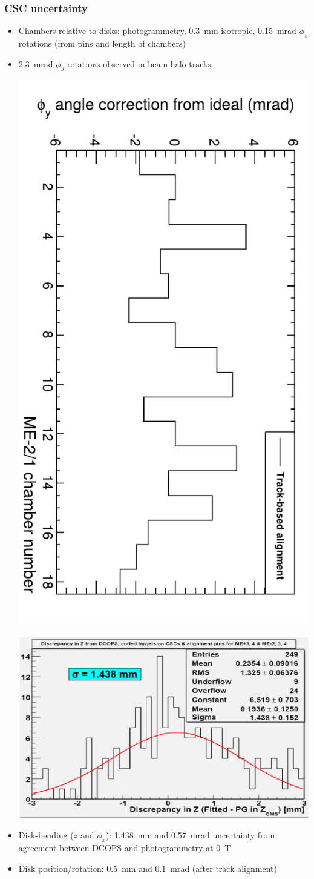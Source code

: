 \documentclass[compress]{beamer}
\begin{document}
\begin{frame}
\frametitle{CSC uncertainty}
\begin{itemize}\setlength{\itemsep}{0.25 cm}
\item Chambers relative to disks: photogrammetry, 0.3~mm isotropic,
  0.15~mrad $\phi_z$ rotations (from pins and length of chambers)
\item 2.3~mrad $\phi_y$ rotations observed in beam-halo tracks

\mbox{\hspace{-1 cm}\includegraphics[height=0.6\linewidth, angle=90]{compare_m21_phiy.pdf}
\includegraphics[width=0.5\linewidth]{dcops_in_z_replacement.png}}

\item Disk-bending ($z$ and $\phi_x$): 1.438~mm and 0.57~mrad
  uncertainty from agreement between DCOPS and photogrammetry at 0~T
\item Disk position/rotation: 0.5~mm and 0.1~mrad (after track alignment)
\end{itemize}
\end{frame}
\end{document}
